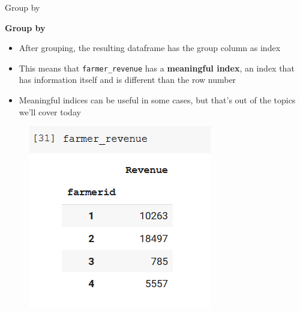 \documentclass[aspectratio=169]{beamer}
\begin{document}
\begin{frame}{Group by}

	\textbf{Group by}

	\begin{multicols}{2}
		\begin{itemize}
			\item After grouping, the resulting dataframe has the group column as index
			\item This means that \texttt{farmer\_revenue} has a \textbf{meaningful index}, an index that has information itself and is different than the row number
			\item Meaningful indices can be useful in some cases, but that's out of the topics we'll cover today
		\end{itemize}

		\begin{figure}
			\centering
			\includegraphics[width=0.8\linewidth]{img/farmer_revenue.png}
		\end{figure}
	\end{multicols}

\end{frame}
\end{document}
